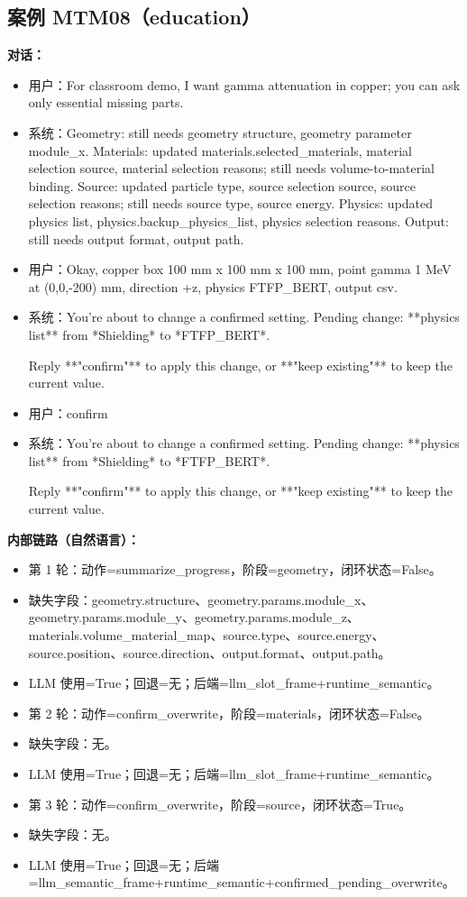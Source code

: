\documentclass[11pt]{ctexart}
\begin{document}
\subsection{案例 MTM08（education）}
\textbf{对话：}
\begin{itemize}
\item 用户：For classroom demo, I want gamma attenuation in copper; you can ask only essential missing parts.
\item 系统：Geometry: still needs geometry structure, geometry parameter module\_x. Materials: updated materials.selected\_materials, material selection source, material selection reasons; still needs volume-to-material binding. Source: updated particle type, source selection source, source selection reasons; still needs source type, source energy. Physics: updated physics list, physics.backup\_physics\_list, physics selection reasons. Output: still needs output format, output path.
\item 用户：Okay, copper box 100 mm x 100 mm x 100 mm, point gamma 1 MeV at (0,0,-200) mm, direction +z, physics FTFP\_BERT, output csv.
\item 系统：You're about to change a confirmed setting.  
Pending change: **physics list** from *Shielding* to *FTFP\_BERT*.  

Reply **"confirm"** to apply this change, or **"keep existing"** to keep the current value.
\item 用户：confirm
\item 系统：You're about to change a confirmed setting.  
Pending change: **physics list** from *Shielding* to *FTFP\_BERT*.  

Reply **"confirm"** to apply this change, or **"keep existing"** to keep the current value.
\end{itemize}
\textbf{内部链路（自然语言）：}
\begin{itemize}
\item 第 1 轮：动作=summarize\_progress，阶段=geometry，闭环状态=False。
\item 缺失字段：geometry.structure、geometry.params.module\_x、geometry.params.module\_y、geometry.params.module\_z、materials.volume\_material\_map、source.type、source.energy、source.position、source.direction、output.format、output.path。
\item LLM 使用=True；回退=无；后端=llm\_slot\_frame+runtime\_semantic。
\item 第 2 轮：动作=confirm\_overwrite，阶段=materials，闭环状态=False。
\item 缺失字段：无。
\item LLM 使用=True；回退=无；后端=llm\_slot\_frame+runtime\_semantic。
\item 第 3 轮：动作=confirm\_overwrite，阶段=source，闭环状态=True。
\item 缺失字段：无。
\item LLM 使用=True；回退=无；后端=llm\_semantic\_frame+runtime\_semantic+confirmed\_pending\_overwrite。
\end{itemize}
\end{document}
